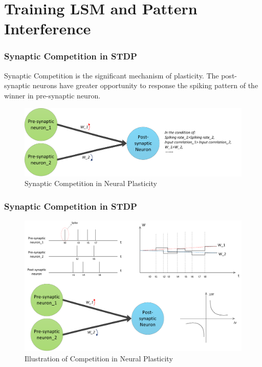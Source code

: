 \documentclass[10pt,aspectratio=43,mathserif, notes]{beamer}
\begin{document}
\begin{frame}
\begin{columns}
\begin{column}{0.5\textwidth}
\begin{figure}[h]
            \end{figure}
            \end{column}
            \end{columns}
		\end{frame}

\section[Algorithms]{Training LSM and Pattern Interference}
		\begin{frame}
		  \frametitle{\textbf{Synaptic Competition in STDP}}
            \noindent Synaptic Competition is the significant mechanism of plasticity. The post-synaptic neurons have greater opportunity to response the spiking pattern of the winner in pre-synaptic neuron.\cite{RN172}
            \begin{figure}[htb]
            \centering
            \includegraphics[width=0.9\linewidth]{image/synaptic_competition.pdf}
            \caption{Synaptic Competition in Neural Plasticity}
            \label{Competition_1}
            \end{figure}
		\end{frame}

		\begin{frame}
		  \frametitle{\textbf{Synaptic Competition in STDP}}
            \begin{figure}[htb]
            \centering
            \includegraphics[width=0.9\linewidth]{image/illustration_competition.pdf}
            \caption{Illustration of Competition in Neural Plasticity}
            \label{Competition_2}
            \end{figure}
		\end{frame}
\end{document}

